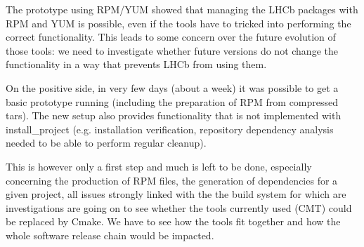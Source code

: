 \documentclass{lhcbnote}
\begin{document}
The prototype using RPM/YUM showed that managing the LHCb packages with RPM and YUM is possible, even if the tools have to tricked into performing the correct functionality. This leads to some concern over the future evolution of those tools: we need to investigate whether future versions do not change the functionality in a way that prevents LHCb from using them.

On the positive side, in very few days (about a week) it was possible to get a basic prototype running (including the preparation of RPM from compressed tars). The new setup also provides functionality that is not implemented with install\_project (e.g. installation verification, repository dependency analysis needed to be able to perform regular cleanup).

This is however only a first step and much is left to be done, especially concerning the production of RPM files, the generation of dependencies for a given project, all issues strongly linked with the the build system for which are investigations are going on to see whether the tools currently used (CMT) could be replaced by Cmake. We have to see how the tools fit together and how the whole software release chain would be impacted.
\end{document}
